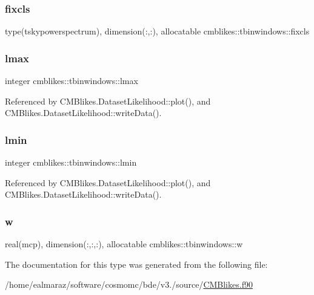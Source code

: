 \subsubsection{\texorpdfstring{fixcls}{fixcls}}
{\footnotesize\ttfamily type(tskypowerspectrum), dimension(\+:,\+:), allocatable cmblikes\+::tbinwindows\+::fixcls\hspace{0.3cm}{\ttfamily [private]}}

\mbox{\label{structcmblikes_1_1tbinwindows_ae5127896c2e731a2c0a0462f37f46eff}} 
\subsubsection{\texorpdfstring{lmax}{lmax}}
{\footnotesize\ttfamily integer cmblikes\+::tbinwindows\+::lmax\hspace{0.3cm}{\ttfamily [private]}}



Referenced by C\+M\+Blikes.\+Dataset\+Likelihood\+::plot(), and C\+M\+Blikes.\+Dataset\+Likelihood\+::write\+Data().

\mbox{\label{structcmblikes_1_1tbinwindows_a2c4fb8bbfaf978ed6a869b9246528c7e}} 
\subsubsection{\texorpdfstring{lmin}{lmin}}
{\footnotesize\ttfamily integer cmblikes\+::tbinwindows\+::lmin\hspace{0.3cm}{\ttfamily [private]}}



Referenced by C\+M\+Blikes.\+Dataset\+Likelihood\+::plot(), and C\+M\+Blikes.\+Dataset\+Likelihood\+::write\+Data().

\mbox{\label{structcmblikes_1_1tbinwindows_a673f7873fea6e9964f3c41c0a051edd2}} 
\subsubsection{\texorpdfstring{w}{w}}
{\footnotesize\ttfamily real(mcp), dimension(\+:,\+:,\+:), allocatable cmblikes\+::tbinwindows\+::w\hspace{0.3cm}{\ttfamily [private]}}



The documentation for this type was generated from the following file\+:\begin{DoxyCompactItemize}
\item 
/home/ealmaraz/software/cosmomc/bde/v3./source/\mbox{\hyperlink{CMBlikes_8f90}{C\+M\+Blikes.\+f90}}\end{DoxyCompactItemize}
